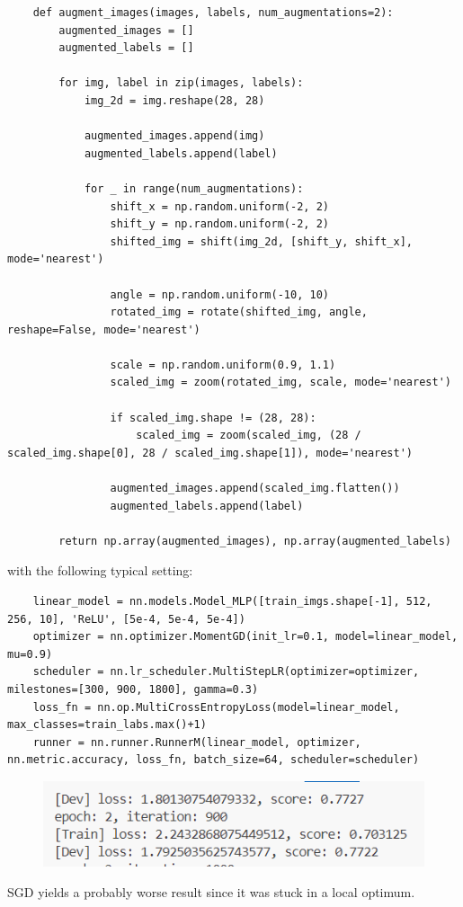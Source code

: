 \documentclass[]{article}
\begin{document}
\begin{lstlisting}
	def augment_images(images, labels, num_augmentations=2):
		augmented_images = []
		augmented_labels = []
		
		for img, label in zip(images, labels):
			img_2d = img.reshape(28, 28)
		
			augmented_images.append(img)
			augmented_labels.append(label)
			
			for _ in range(num_augmentations):
				shift_x = np.random.uniform(-2, 2)
				shift_y = np.random.uniform(-2, 2)
				shifted_img = shift(img_2d, [shift_y, shift_x], mode='nearest')
				
				angle = np.random.uniform(-10, 10)
				rotated_img = rotate(shifted_img, angle, reshape=False, mode='nearest')
				
				scale = np.random.uniform(0.9, 1.1)
				scaled_img = zoom(rotated_img, scale, mode='nearest')
				
				if scaled_img.shape != (28, 28):
					scaled_img = zoom(scaled_img, (28 / scaled_img.shape[0], 28 / scaled_img.shape[1]), mode='nearest')
					
				augmented_images.append(scaled_img.flatten())
				augmented_labels.append(label)
		
		return np.array(augmented_images), np.array(augmented_labels)
\end{lstlisting}

with the following typical setting:
\begin{lstlisting}
	linear_model = nn.models.Model_MLP([train_imgs.shape[-1], 512, 256, 10], 'ReLU', [5e-4, 5e-4, 5e-4])
	optimizer = nn.optimizer.MomentGD(init_lr=0.1, model=linear_model, mu=0.9)
	scheduler = nn.lr_scheduler.MultiStepLR(optimizer=optimizer, milestones=[300, 900, 1800], gamma=0.3)
	loss_fn = nn.op.MultiCrossEntropyLoss(model=linear_model, max_classes=train_labs.max()+1)
	runner = nn.runner.RunnerM(linear_model, optimizer, nn.metric.accuracy, loss_fn, batch_size=64, scheduler=scheduler)
\end{lstlisting}
\begin{figure}[H]
	\centering
	\includegraphics[width=0.7\linewidth]{Q6}
	\caption{}
	\label{fig:q6}
\end{figure}

SGD yields a probably worse result since it was ​​stuck in a local optimum​.
\end{document}
